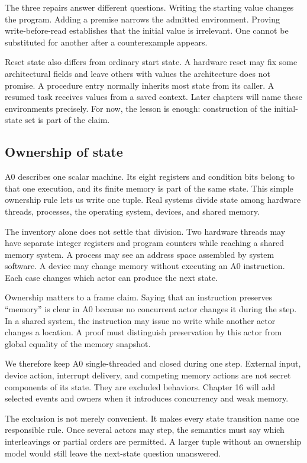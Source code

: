 The three repairs answer different questions. Writing the starting value
changes the program. Adding a premise narrows the admitted environment.
Proving write-before-read establishes that the initial value is irrelevant.
One cannot be substituted for another after a counterexample appears.

Reset state also differs from ordinary start state. A hardware reset may fix
some architectural fields and leave others with values the architecture does
not promise. A procedure entry normally inherits most state from its caller.
A resumed task receives values from a saved context. Later chapters will name
these environments precisely. For now, the lesson is enough: construction of
the initial-state set is part of the claim.

\subsection{Ownership of state}

A0 describes one scalar machine. Its eight registers and condition bits belong
to that one execution, and its finite memory is part of the same state. This
simple ownership rule lets us write one tuple. Real systems divide state among
hardware threads, processes, the operating system, devices, and shared memory.

The inventory alone does not settle that division. Two hardware threads may
have separate integer registers and program counters while reaching a shared
memory system. A process may see an address space assembled by system
software. A device may change memory without executing an A0 instruction.
Each case changes which actor can produce the next state.

Ownership matters to a frame claim. Saying that an instruction preserves
``memory'' is clear in A0 because no concurrent actor changes it during the
step. In a shared system, the instruction may issue no write while another
actor changes a location. A proof must distinguish preservation by this actor
from global equality of the memory snapshot.

We therefore keep A0 single-threaded and closed during one step. External
input, device action, interrupt delivery, and competing memory actions are not
secret components of its state. They are excluded behaviors. Chapter 16 will
add selected events and owners when it introduces concurrency and weak memory.

The exclusion is not merely convenient. It makes every state transition name
one responsible rule. Once several actors may step, the semantics must say
which interleavings or partial orders are permitted. A larger tuple without an
ownership model would still leave the next-state question unanswered.

